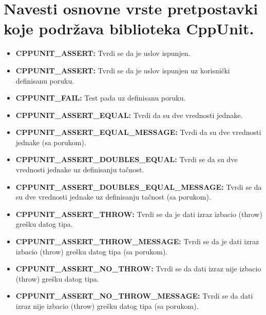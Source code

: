 \documentclass[a4paper]{article}
\begin{document}
\section{Navesti osnovne vrste pretpostavki koje podržava biblioteka CppUnit.}
  \begin{itemize}
    \item \textbf{CPPUNIT\_ASSERT:} Tvrdi se da je uslov ispunjen.
    \item \textbf{CPPUNIT\_ASSERT:} Tvrdi se da je uslov ispunjen uz korisnički definisanu poruku.
    \item \textbf{CPPUNIT\_FAIL:} Test pada uz definisanu poruku.
    \item \textbf{CPPUNIT\_ASSERT\_EQUAL:} Tvrdi da su dve vrednosti jednake.
    \item \textbf{CPPUNIT\_ASSERT\_EQUAL\_MESSAGE:} Tvrdi da su dve vrednosti jednake (sa porukom).
    \item \textbf{CPPUNIT\_ASSERT\_DOUBLES\_EQUAL:} Tvrdi se da su dve vrednosti jednake uz
          definisanju tačnost.
    \item \textbf{CPPUNIT\_ASSERT\_DOUBLES\_EQUAL\_MESSAGE:} Tvrdi se da su dve vrednosti jednake uz
          definisanju tačnost (sa porukom).
    \item \textbf{CPPUNIT\_ASSERT\_THROW:} Tvrdi se da je dati izraz izbacio (throw) grešku datog tipa.
    \item \textbf{CPPUNIT\_ASSERT\_THROW\_MESSAGE:} Tvrdi se da je dati izraz izbacio (throw) grešku datog tipa
          (sa porukom).
    \item \textbf{CPPUNIT\_ASSERT\_NO\_THROW:} Tvrdi se da dati izraz nije izbacio (throw) grešku datog tipa.
    \item \textbf{CPPUNIT\_ASSERT\_NO\_THROW\_MESSAGE:} Tvrdi se da dati izraz nije izbacio 
          (throw) grešku datog tipa
          (sa porukom). \cite{cppunit_asserts}
  \end{itemize} 
\end{document}
